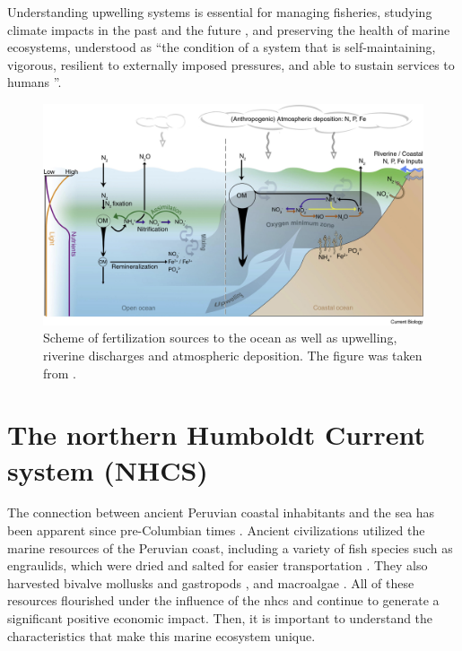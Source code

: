 Understanding upwelling systems is essential for managing fisheries, studying climate impacts in the past and the future \citep{BakuBlac2015,DiLo2015,TimZori2016}, and preserving the health of marine ecosystems, understood as ``the condition of a system that is self-maintaining, vigorous, resilient to externally imposed pressures, and able to sustain services to humans \citep{TettGowe2013}''.\\

\begin{figure}[H]
	\includegraphics[width=1.0\textwidth]{figures/Chap1UpwellingFertilization.jpg}
	\centering
	\caption{Scheme of fertilization sources to the ocean as well as upwelling, riverine discharges and atmospheric deposition. The figure was taken from \cite{BrisMohr2017}.}
	\centering
	\label{Chap1UpwellingFertilization}
\end{figure}

\clearpage
\section{The northern Humboldt Current system (NHCS)}\label{Chap1NHCS}
The connection between ancient Peruvian coastal inhabitants and the sea has been apparent since pre-Columbian times \citep{Prie2014,Prie2019}. Ancient civilizations utilized the marine resources of the Peruvian coast, including a variety of fish species such as engraulids, which were dried and salted for easier transportation \citep{MarcSomm1999}. They also harvested bivalve mollusks and gastropods \citep{ChicRoja2013,WeinOsbo2022}, and macroalgae \citep{AvilPadi2020}. All of these resources flourished under the influence of the \acrfull{nhcs} and continue to generate a significant positive economic impact. Then, it is important to understand the characteristics that make this marine ecosystem unique.\\

